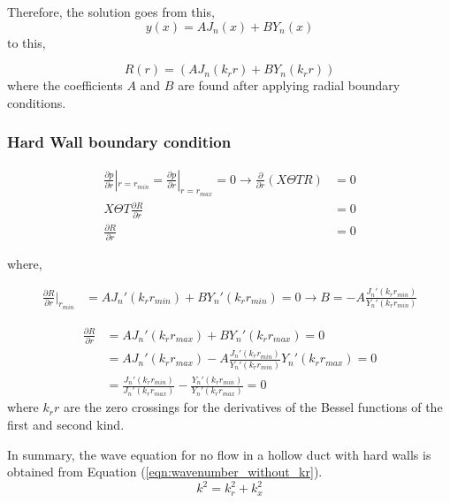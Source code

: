 Therefore, the solution goes from this,
\begin{equation}
    y(x) = AJ_n(x) + BY_n(x)
    \label{eqn:besselsolution}
\end{equation}
to this,


\begin{equation}
    R(r) = (AJ_n(k_r r) + BY_n(k_r r)) 
    \label{eqn:besselsolution}
\end{equation}
where the coefficients $A$ and $B$ are found after applying radial
boundary conditions. %




\subsubsection{Hard Wall boundary condition}
\begin{align*}
    \frac{\partial p}{\partial r}|_{r = r_{min}}  =\frac{\partial p}{\partial r}|_{r = r_{max}} = 0 \rightarrow 
    \frac{\partial}{\partial r} \left( X\Theta T R \right) &= 0 \\
    X \Theta T\frac{\partial R}{\partial r}  &= 0 \\
    \frac{\partial R}{\partial r}  &= 0 
\end{align*}

where,


\begin{align*} 
    \frac{ \partial R}{\partial r}|_{r_{min}} &= AJ_n'(k_r r_{min}) + B Y_n' (k_r r_{min}) = 0 
    \rightarrow B = -A \frac{J_n'(k_r r_{min})}{Y_n'(k_r r_{min})}
\end{align*}


\begin{align*} 
    \frac{ \partial R}{\partial r} &= AJ_n'(k_r r_{max}) + B Y_n' (k_r r_{max}) = 0 \\
                                   &= AJ_n'(k_r r_{max}) - A\frac{J_n' (k_r r_{min})}{Y_n'(k_r r_{min})} Y_n' (k_r r_{max}) = 0 \\
                                   &= \frac{J_n'(k_r r_{min})}{J_n' (k_r r_{max})} - \frac{Y_n'(k_r r_{min})}{Y_n' (k_r r_{max})} = 0 
\end{align*}
where $k_r r$ are the zero crossings for the derivatives of the Bessel functions of the first and second kind.

In summary, the wave equation for no flow in a hollow duct with hard walls is obtained 
from Equation (\ref{eqn:wavenumber_without_kr}).
\begin{equation}
    k^2 = k_r^2 + k_x^2
    \label{eqn:wavenumber_equation}
\end{equation}


